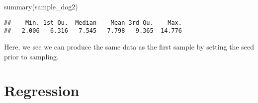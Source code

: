 \documentclass[
]{book}
\newenvironment{Shaded}{\begin{snugshade}}{\end{snugshade}}
\newcommand{\FunctionTok}[1]{\textcolor[rgb]{0.00,0.00,0.00}{#1}}
\newcommand{\NormalTok}[1]{#1}
\begin{document}
\begin{Shaded}
\begin{Highlighting}[]
\FunctionTok{summary}\NormalTok{(sample\_dog2)}
\end{Highlighting}
\end{Shaded}

\begin{verbatim}
##    Min. 1st Qu.  Median    Mean 3rd Qu.    Max. 
##   2.006   6.316   7.545   7.798   9.365  14.776
\end{verbatim}

Here, we see we can produce the same data as the first sample by setting the seed prior to sampling.

\hypertarget{regression}{%
\section{Regression}\label{regression}}

  
\end{document}
